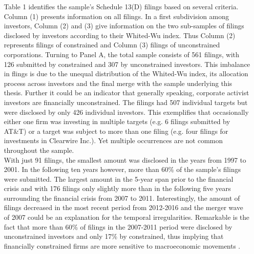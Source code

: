 \documentclass[12pt]{article}
\begin{document}
Table 1 identifies the sample's Schedule 13(D) filings based on several criteria. Column (1) presents information on all filings. In a first subdivision among investors, Column (2) and (3) give information on the two sub-samples of filings disclosed by investors according to their Whited-Wu index. Thus Column (2) represents filings of constrained and Column (3) filings of unconstrained corporations.
Turning to Panel A, the total sample consists of 561 filings, with 126 submitted by constrained and 307 by unconstrained investors. This imbalance in flings is due to the unequal distribution of the Whited-Wu index, its allocation process across investors and the final merge with the sample underlying this thesis. Further it could be an indicator that generally speaking, corporate activist investors are financially unconstrained.
The filings had 507 individual targets but were disclosed by only 426 individual investors. This exemplifies that occasionally either one firm was investing in multiple targets (e.g. 6 filings submitted by AT\&T) or a target was subject to more than one filing (e.g. four filings for investments in Clearwire Inc.). Yet multiple occurrences are not common throughout the sample.\\ 
With just 91 filings, the smallest amount was disclosed in the years from 1997 to 2001. In the following ten years however, more than 60\% of the sample's filings were submitted. The largest amount in the 5-year span prior to the financial crisis and with 176 filings only slightly more than in the following five years surrounding the financial crisis from 2007 to 2011. Interestingly, the amount of filings decreased in the most recent period from 2012-2016 and the merger wave of 2007 \citep[p.19]{Huang2017} could be an explanation for the temporal irregularities. Remarkable is the fact that more than 60\% of filings in the 2007-2011 period were disclosed by unconstrained investors and only 17\% by constrained, thus implying that financially constrained firms are more sensitive to macroeconomic movements \citep[p.1197]{Campello2006}.
\pagebreak

\end{document}
